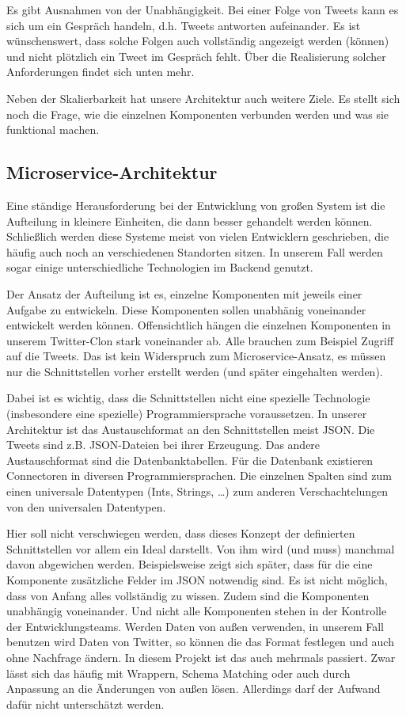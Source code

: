 Es gibt Ausnahmen von der Unabhängigkeit. Bei einer Folge von Tweets kann es sich um ein Gespräch handeln, d.h. Tweets
antworten aufeinander. Es ist wünschenswert, dass solche Folgen auch vollständig angezeigt werden (können) und nicht
plötzlich ein Tweet im Gespräch fehlt. Über die Realisierung solcher Anforderungen findet sich unten mehr.

Neben der Skalierbarkeit hat unsere Architektur auch weitere Ziele. Es stellt sich noch die Frage, wie die einzelnen
Komponenten verbunden werden und was sie funktional machen.

\subsection{Microservice-Architektur}
Eine ständige Herausforderung bei der Entwicklung von großen System ist die Aufteilung in kleinere Einheiten, die
dann besser gehandelt werden können. Schließlich werden diese Systeme meist von vielen Entwicklern geschrieben,
die häufig auch noch an verschiedenen Standorten sitzen. In unserem Fall werden sogar einige unterschiedliche Technologien
im Backend genutzt.

Der Ansatz der Aufteilung ist es, einzelne Komponenten mit jeweils einer Aufgabe zu entwickeln. Diese Komponenten sollen
unabhänig voneinander entwickelt werden können. Offensichtlich hängen die einzelnen Komponenten in unserem
Twitter-Clon stark voneinander ab. Alle brauchen zum Beispiel Zugriff auf die Tweets. Das ist kein Widerspruch zum 
Microservice-Ansatz, es müssen nur die Schnittstellen vorher erstellt werden (und später eingehalten werden).

Dabei ist es wichtig, dass die Schnittstellen nicht eine spezielle Technologie (insbesondere eine spezielle) Programmiersprache
voraussetzen. In unserer Architektur ist das Austauschformat an den Schnittstellen meist JSON. Die Tweets sind z.B.
JSON-Dateien bei ihrer Erzeugung. Das andere Austauschformat sind die Datenbanktabellen. Für die Datenbank existieren
Connectoren in diversen Programmiersprachen. Die einzelnen Spalten sind zum einen universale Datentypen (Ints, Strings, \dots)
zum anderen Verschachtelungen von den universalen Datentypen.

Hier soll nicht verschwiegen werden, dass dieses Konzept der definierten Schnittstellen vor allem ein Ideal darstellt.
Von ihm wird (und muss) manchmal davon abgewichen werden. Beispielsweise zeigt sich später, dass für die eine
Komponente zusätzliche Felder im JSON notwendig sind. Es ist nicht möglich, dass von Anfang alles
vollständig zu wissen. Zudem sind die Komponenten unabhängig voneinander.
Und nicht alle Komponenten stehen in der Kontrolle der Entwicklungsteams. Werden Daten von außen verwenden,
in unserem Fall benutzen wird Daten von Twitter, so können die das Format festlegen und auch ohne Nachfrage ändern.
In diesem Projekt ist das auch mehrmals passiert. Zwar lässt sich das häufig mit Wrappern, Schema Matching oder auch durch Anpassung
an die Änderungen von außen lösen. Allerdings darf der Aufwand dafür nicht unterschätzt werden.

